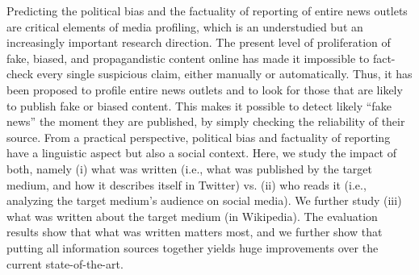 Predicting the political bias and the factuality of reporting of entire news outlets are critical elements of media profiling, which is an understudied but an increasingly important research direction. The present level of proliferation of fake, biased, and propagandistic content online has made it impossible to fact-check every single suspicious claim, either manually or automatically. Thus, it has been proposed to profile entire news outlets and to look for those that are likely to publish fake or biased content. This makes it possible to detect likely ``fake news'' the moment they are published, by simply checking the reliability of their source. From a practical perspective, political bias and factuality of reporting have a linguistic aspect but also a social context. Here, we study the impact of both, namely (i) what was written (i.e., what was published by the target medium, and how it describes itself in Twitter) vs. (ii) who reads it (i.e., analyzing the target medium's audience on social media). We further study (iii) what was written about the target medium (in Wikipedia). The evaluation results show that what was written matters most, and we further show that putting all information sources together yields huge improvements over the current state-of-the-art.
